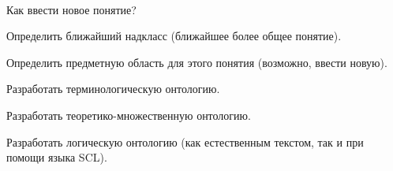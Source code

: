\begin{frame}{\\Как ввести новое понятие?}
	\topline
	\justifying
	\vspace{8mm}
	
	\begin{textitemize}
		\item Определить ближайший надкласс (ближайшее более общее понятие). 
		\item Определить предметную область для этого понятия (возможно, ввести новую). 
		\item Разработать терминологическую онтологию. 
		\item Разработать теоретико-множественную онтологию.
		\item Разработать логическую онтологию (как естественным текстом, так и при помощи языка SCL).
	\end{textitemize}
	
\end{frame}



